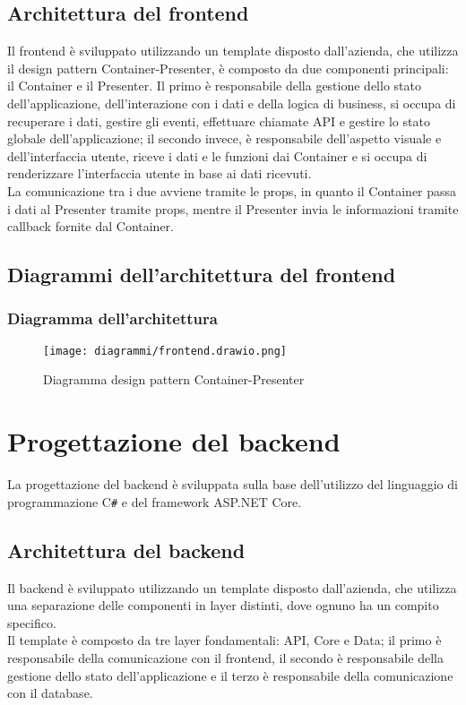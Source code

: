 \subsection{Architettura del frontend}
Il frontend è sviluppato utilizzando un template disposto dall'azienda, che utilizza il design pattern Container-Presenter, è composto da due componenti principali: il Container e il Presenter.
Il primo è responsabile della gestione dello stato dell'applicazione, dell'interazione con i dati e della logica di business, si occupa di recuperare i dati, gestire gli eventi, effettuare chiamate API e gestire lo stato globale dell'applicazione; il secondo invece, è responsabile dell'aspetto visuale e dell'interfaccia utente, riceve i dati e le funzioni dai Container e si occupa di renderizzare l'interfaccia utente in base ai dati ricevuti.\\
La comunicazione tra i due avviene tramite le props, in quanto il Container passa i dati al Presenter tramite props, mentre il Presenter invia le informazioni tramite callback fornite dal Container.\\
\subsection{Diagrammi dell'architettura del frontend}
\subsubsection{Diagramma dell'architettura}
\begin{figure}[!h] 
    \centering 
    \texttt{[image: diagrammi/frontend.drawio.png]} 
    \caption{Diagramma design pattern Container-Presenter}
\end{figure}
\clearpage
\section{Progettazione del backend}
La progettazione del backend è sviluppata sulla base dell'utilizzo del linguaggio di programmazione C\texttt{\#} e del framework ASP.NET Core.\\
\subsection{Architettura del backend}
Il backend è sviluppato utilizzando un template disposto dall'azienda, che utilizza una separazione delle componenti in layer distinti, dove ognuno ha un compito specifico.\\
Il template è composto da tre layer fondamentali: API, Core e Data; il primo è responsabile della comunicazione con il frontend, il secondo è responsabile della gestione dello stato dell'applicazione e il terzo è responsabile della comunicazione con il database.\\
